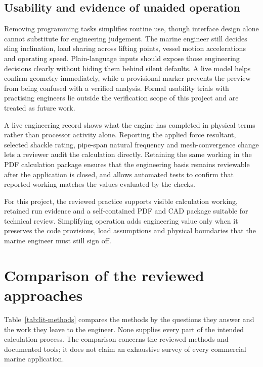 \subsection{Usability and evidence of unaided operation}
\label{sec:lit-usability}

Removing programming tasks simplifies routine use, though interface design alone cannot substitute for engineering judgement. The marine engineer still decides sling inclination, load sharing across lifting points, vessel motion accelerations and operating speed. Plain-language inputs should expose those engineering decisions clearly without hiding them behind silent defaults. A live model helps confirm geometry immediately, while a provisional marker prevents the preview from being confused with a verified analysis. Formal usability trials with practising engineers lie outside the verification scope of this project and are treated as future work.

A live engineering record shows what the engine has completed in physical terms rather than processor activity alone. Reporting the applied force resultant, selected shackle rating, pipe-span natural frequency and mesh-convergence change lets a reviewer audit the calculation directly. Retaining the same working in the PDF calculation package ensures that the engineering basis remains reviewable after the application is closed, and allows automated tests to confirm that reported working matches the values evaluated by the checks.

For this project, the reviewed practice supports visible calculation working, retained run evidence and a self-contained PDF and CAD package suitable for technical review. Simplifying operation adds engineering value only when it preserves the code provisions, load assumptions and physical boundaries that the marine engineer must still sign off.

\section{Comparison of the reviewed approaches}
\label{sec:lit-method-comparison}

Table~\ref{tab:lit-methods} compares the methods by the questions they answer and the work they leave to the engineer. None supplies every part of the intended calculation process. The comparison concerns the reviewed methods and documented tools; it does not claim an exhaustive survey of every commercial marine application.

